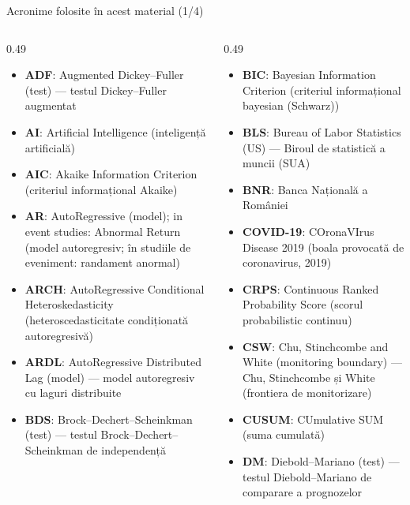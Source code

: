 \begin{frame}{Acronime folosite în acest material (1/4)}
\begin{columns}[T]
\begin{column}{0.49\textwidth}
\begin{itemize}\setlength{\itemsep}{0pt}
    \item \textbf{ADF}: Augmented Dickey–Fuller (test) — testul Dickey–Fuller augmentat
    \item \textbf{AI}: Artificial Intelligence (inteligență artificială)
    \item \textbf{AIC}: Akaike Information Criterion (criteriul informațional Akaike)
    \item \textbf{AR}: AutoRegressive (model); in event studies: Abnormal Return (model autoregresiv; în studiile de eveniment: randament anormal)
    \item \textbf{ARCH}: AutoRegressive Conditional Heteroskedasticity (heteroscedasticitate condiționată autoregresivă)
    \item \textbf{ARDL}: AutoRegressive Distributed Lag (model) — model autoregresiv cu laguri distribuite
    \item \textbf{BDS}: Brock–Dechert–Scheinkman (test) — testul Brock–Dechert–Scheinkman de independență
\end{itemize}
\end{column}
\begin{column}{0.49\textwidth}
\begin{itemize}\setlength{\itemsep}{0pt}
    \item \textbf{BIC}: Bayesian Information Criterion (criteriul informațional bayesian (Schwarz))
    \item \textbf{BLS}: Bureau of Labor Statistics (US) — Biroul de statistică a muncii (SUA)
    \item \textbf{BNR}: Banca Națională a României
    \item \textbf{COVID-19}: COronaVIrus Disease 2019 (boala provocată de coronavirus, 2019)
    \item \textbf{CRPS}: Continuous Ranked Probability Score (scorul probabilistic continuu)
    \item \textbf{CSW}: Chu, Stinchcombe and White (monitoring boundary) — Chu, Stinchcombe și White (frontiera de monitorizare)
    \item \textbf{CUSUM}: CUmulative SUM (suma cumulată)
    \item \textbf{DM}: Diebold–Mariano (test) — testul Diebold–Mariano de comparare a prognozelor
\end{itemize}
\end{column}
\end{columns}
\end{frame}
